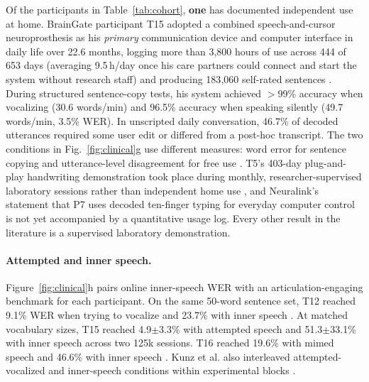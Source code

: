 \documentclass[11pt]{article}
\newcommand{\wpm}{words/min}
\begin{document}
Of the participants in Table~\ref{tab:cohort}, \textbf{one} has
documented independent use at home. BrainGate participant T15 adopted a
combined speech-and-cursor neuroprosthesis as his \emph{primary}
communication device and computer interface in daily life over 22.6
months, logging more than 3{,}800 hours of use across 444 of 653 days
(averaging 9.5\,h/day once his care partners could connect and start the
system without research staff) and producing 183{,}060 self-rated
sentences \cite{card2026}. During structured sentence-copy tests, his
system achieved $>$99\% accuracy when vocalizing (30.6 \wpm{}) and
96.5\% accuracy when speaking silently (49.7 \wpm{}, 3.5\% WER).
In unscripted daily conversation, 46.7\% of decoded utterances required
some user edit or differed from a post-hoc transcript. The two
conditions in Fig.~\ref{fig:clinical}g use different measures: word
error for sentence copying and utterance-level disagreement for free
use \cite{card2026}. T5's 403-day
plug-and-play handwriting demonstration took place during monthly,
researcher-supervised laboratory sessions rather than independent home
use \cite{fan2023}, and Neuralink's statement that P7 uses decoded
ten-finger typing for everyday computer control \cite{neuralink2026}
is not yet accompanied by a quantitative usage log. Every other result
in the literature is a supervised laboratory demonstration.

\paragraph{Attempted and inner speech.} Figure~\ref{fig:clinical}h
pairs online inner-speech WER with an articulation-engaging benchmark
for each participant. On the same 50-word sentence set, T12 reached
9.1\% WER when trying to vocalize \cite{willett2023} and 23.7\% with
inner speech \cite{kunz2025}. At matched vocabulary sizes, T15
reached 4.9$\pm$3.3\% with attempted speech \cite{card2024} and
51.3$\pm$33.1\% with inner speech across two 125k sessions. T16
reached 19.6\% with mimed speech \cite{nason2026} and 46.6\% with
inner speech \cite{kunz2025}. Kunz et al. also interleaved
attempted-vocalized and inner-speech conditions within experimental
blocks \cite{kunz2025}.
\end{document}
